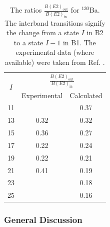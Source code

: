\begin{table}
    \centering
    \begin{tabular}{|c|cc|}
    \hline
    \multirow{2}{*}{$I$} & \multicolumn{2}{c|}{$\frac{B(E2)_\text{out}}{B(E2)_\text{in}}$} \\ \cline{2-3} 
                         & \multicolumn{1}{c|}{Experimental}          & Calculated         \\ \hline
    11                   & \multicolumn{1}{c|}{}                      & 0.37           \\ \hline
    13                   & \multicolumn{1}{c|}{0.32}                  & 0.32           \\ \hline
    15                   & \multicolumn{1}{c|}{0.36}                  & 0.27           \\ \hline
    17                   & \multicolumn{1}{c|}{0.22}                  & 0.24           \\ \hline
    19                   & \multicolumn{1}{c|}{0.22}                  & 0.21           \\ \hline
    21                   & \multicolumn{1}{c|}{0.41}                  & 0.19           \\ \hline
    23                   & \multicolumn{1}{c|}{}                      & 0.18           \\ \hline
    25                   & \multicolumn{1}{c|}{}                      & 0.16           \\ \hline
    \end{tabular}%
    \caption{The ratios $\frac{B(E2)_\text{out}}{B(E2)_\text{in}}$ for $^{130}$Ba. The interband transitions signify the change from a state $I$ in B2 to a state $I-1$ in B1. The experimental data (where available) were taken from Ref. \cite{petrache2019diversity,chen2019transverse}.}
    \label{BE2-out-in-ratio-130Ba}
\end{table}

\subsubsection{General Discussion}

